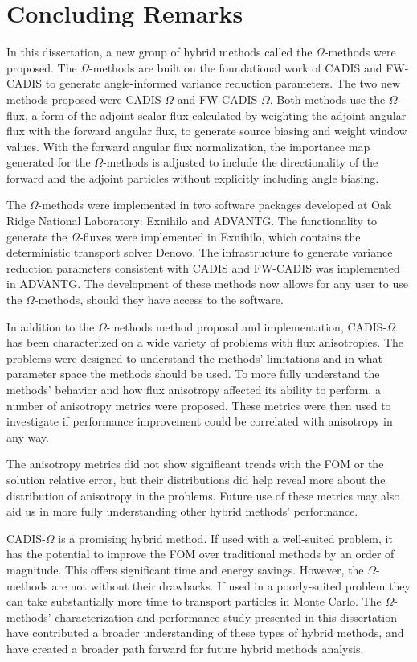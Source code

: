 \section{Concluding Remarks}
\label{sec:concluding-remarks}

In this dissertation, a new group of hybrid methods called the $\Omega$-methods
were
proposed. The $\Omega$-methods are built on the foundational work of CADIS
and FW-CADIS to generate angle-informed variance reduction parameters. The two
new methods proposed were CADIS-$\Omega$ and FW-CADIS-$\Omega$. Both methods use
the $\Omega$-flux, a form of the adjoint scalar flux calculated by weighting the
adjoint angular flux with the forward angular flux, to generate source biasing and weight window
values. With the forward angular flux normalization, the importance map generated for the
$\Omega$-methods is adjusted to include the directionality of
the forward and the adjoint particles without explicitly including angle
biasing.

The $\Omega$-methods were implemented in two software packages developed at Oak
Ridge National Laboratory: Exnihilo and ADVANTG. The functionality to generate
the $\Omega$-fluxes were implemented in Exnihilo, which contains the
deterministic transport solver Denovo. The infrastructure to generate variance
reduction parameters consistent with CADIS and FW-CADIS was implemented in
ADVANTG. The development of these methods now allows for any user to use the
$\Omega$-methods, should they have access to the software.

In addition to the $\Omega$-methods method proposal and
implementation, CADIS-$\Omega$ has been
characterized on a wide variety of problems with flux anisotropies. The problems
were designed to understand the methods' limitations and in what parameter space
the methods should be used. To more fully understand the methods' behavior and how
flux anisotropy affected its ability to perform, a number of anisotropy metrics
were proposed. These metrics were then used
to investigate if performance improvement could be correlated with
anisotropy in any way.

The anisotropy metrics did not show significant trends with the FOM or the
solution relative error, but their distributions did help reveal more about the
distribution of anisotropy in the problems. Future use of these metrics may also
aid us in more fully understanding other hybrid methods' performance.

CADIS-$\Omega$ is a promising hybrid method. If used with a well-suited problem,
it has the potential to improve the FOM over traditional methods by an order of
magnitude. This offers significant time and energy savings. However, the
$\Omega$-methods are not without their drawbacks. If used in a poorly-suited
problem they can take substantially more time to transport particles in
Monte Carlo. The $\Omega$-methods' characterization and performance study
presented in this dissertation have contributed a broader understanding of these types of
hybrid methods, and have created a broader path forward for future hybrid
methods analysis.


